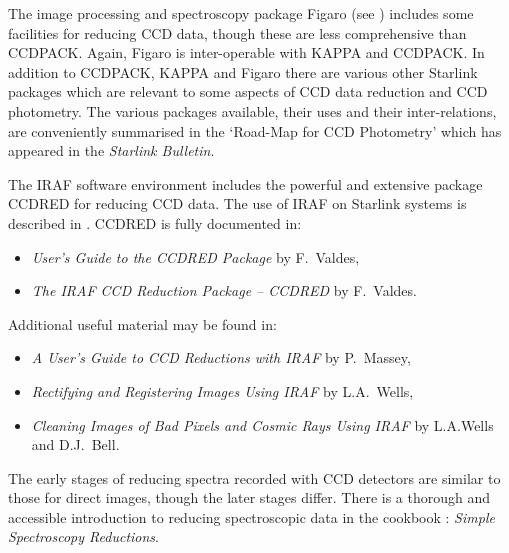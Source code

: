 \documentclass[twoside,11pt]{starlink}
\begin{document}
The image processing and spectroscopy package Figaro (see
\/\cite{SUN86}) includes some facilities for
reducing CCD data, though these are less comprehensive than CCDPACK.
Again, Figaro is inter-operable with KAPPA and CCDPACK.  In addition to
CCDPACK, KAPPA and Figaro there are various other Starlink packages which
are relevant to some aspects of CCD data reduction and CCD photometry.
The various packages available, their uses and their inter-relations,
are conveniently summarised in the `Road-Map for CCD
Photometry'\cite{DAVENHALL98} which has appeared in the \textit{Starlink
Bulletin}.

The IRAF software environment includes the powerful and extensive package
CCDRED for reducing CCD data.  The use of IRAF on Starlink systems is
described in \/\cite{SG12}.  CCDRED is fully
documented in:

\begin{itemize}

  \item \textit{User's Guide to the CCDRED Package}\/ by
   F.~Valdes\cite{VALDES90_1},

  \item \textit{The IRAF CCD Reduction Package -- CCDRED}\/ by
   F.~Valdes\cite{VALDES90_2}.

\end{itemize}

Additional useful material may be found in:

\begin{itemize}

  \item \textit{A User's Guide to CCD Reductions with IRAF}\/ by
   P.~Massey\cite{MASSEY97},

  \item \textit{Rectifying and Registering Images Using IRAF}\/ by
   L.A.~Wells\cite{WELLS94_1},

  \item \textit{Cleaning Images of Bad Pixels and Cosmic Rays Using IRAF}\/
   by L.A.Wells and D.J.~Bell\cite{WELLS94_2}.

\end{itemize}

The early stages of reducing spectra recorded with CCD detectors are
similar to those for direct images, though the later stages differ.  There
is a thorough and accessible introduction to reducing spectroscopic data
in the cookbook : \textit{Simple Spectroscopy
Reductions}\/\cite{SC7}.
\end{document}
